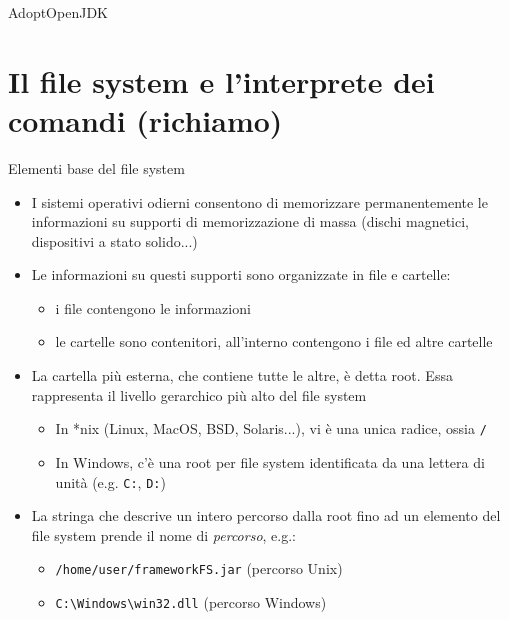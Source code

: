 \documentclass[presentation]{beamer}
\begin{document}
\begin{frame}{AdoptOpenJDK}
\end{frame}



\section{Il file system e l'interprete dei comandi (richiamo)}

\begin{frame}{Elementi base del file system}
  \begin{itemize}
    \item I sistemi operativi odierni consentono di memorizzare permanentemente le informazioni su 
supporti di memorizzazione di massa (dischi magnetici, dispositivi a stato solido...)
    \item Le informazioni su questi supporti sono organizzate in file e cartelle:
      \begin{itemize}
        \item i file contengono le informazioni
        \item le cartelle sono contenitori, all'interno contengono i file ed altre cartelle
      \end{itemize}
    \item La cartella più esterna, che contiene tutte le altre, è detta root. Essa rappresenta il livello gerarchico più alto del file system
      \begin{itemize}
        \item In *nix (Linux, MacOS, BSD, Solaris...), vi è una unica radice, ossia \texttt{/}
        \item In Windows, c'è una root per file system identificata da una lettera di unità (e.g. 
\texttt{C:}, \texttt{D:})
      \end{itemize}
    \item La stringa che descrive un intero percorso dalla root fino ad un elemento del file system
prende il nome di \emph{percorso}, e.g.:
    \begin{itemize}
        \item \texttt{/home/user/frameworkFS.jar} (percorso Unix)
        \item \texttt{C:\textbackslash{}Windows\textbackslash{}win32.dll} (percorso Windows)
    \end{itemize}
  \end{itemize}
\end{frame}
\end{document}
